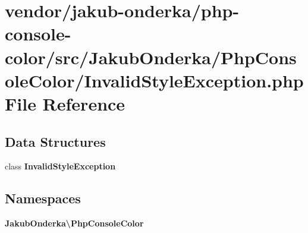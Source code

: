 \section{vendor/jakub-\/onderka/php-\/console-\/color/src/\+Jakub\+Onderka/\+Php\+Console\+Color/\+Invalid\+Style\+Exception.php File Reference}
\label{_invalid_style_exception_8php}
\subsection*{Data Structures}
\begin{DoxyCompactItemize}
\item 
class {\bf Invalid\+Style\+Exception}
\end{DoxyCompactItemize}
\subsection*{Namespaces}
\begin{DoxyCompactItemize}
\item 
 {\bf Jakub\+Onderka\textbackslash{}\+Php\+Console\+Color}
\end{DoxyCompactItemize}
